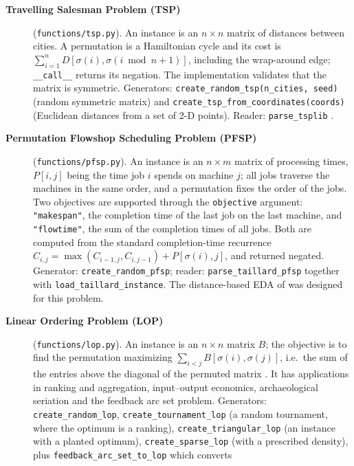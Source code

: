 \documentclass[a4paper,11pt]{article}
\begin{document}
\begin{description}
  \item[\textbf{Travelling Salesman Problem (TSP)}]
    (\texttt{functions/tsp.py}).  An instance is an $n \times n$ matrix of
    distances between cities.  A permutation is a Hamiltonian cycle and its cost
    is
    $\sum_{i=1}^{n} D[\sigma(i), \sigma(i \bmod n + 1)]$,
    including the wrap-around edge; \texttt{\_\_call\_\_} returns its negation.
    The implementation validates that the matrix is symmetric.  Generators:
    \texttt{create\_random\_tsp(n\_cities, seed)} (random symmetric matrix) and
    \texttt{create\_tsp\_from\_coordinates(coords)} (Euclidean distances from a
    set of 2-D points).  Reader: \texttt{parse\_tsplib} \citep{Reinelt:1991}.
  \item[\textbf{Permutation Flowshop Scheduling Problem (PFSP)}]
    (\texttt{functions/pfsp.py}).  An instance is an $n \times m$ matrix of
    processing times, $P[i,j]$ being the time job $i$ spends on machine $j$; all
    jobs traverse the machines in the same order, and a permutation fixes the
    order of the jobs.  Two objectives are supported through the
    \texttt{objective} argument: \texttt{"makespan"}, the completion time of the
    last job on the last machine, and \texttt{"flowtime"}, the sum of the
    completion times of all jobs.  Both are computed from the standard
    completion-time recurrence
    $C_{i,j} = \max(C_{i-1,j}, C_{i,j-1}) + P[\sigma(i), j]$, and returned
    negated.  Generator: \texttt{create\_random\_pfsp}; reader:
    \texttt{parse\_taillard\_pfsp} \citep{Taillard:1993} together with
    \texttt{load\_taillard\_instance}.  The distance-based EDA of
    \cite{Ceberio_et_al:2014} was designed for this problem.
  \item[\textbf{Linear Ordering Problem (LOP)}]
    (\texttt{functions/lop.py}).  An instance is an $n \times n$ matrix $B$; the
    objective is to find the permutation maximizing
    $\sum_{i<j} B[\sigma(i), \sigma(j)]$, i.e.\ the sum of the entries above the
    diagonal of the permuted matrix \citep{Grotschel_et_al:1984,Marti_and_Reinelt:2011}.
    It has applications in ranking and aggregation, input--output economics,
    archaeological seriation and the feedback arc set problem.  Generators:
    \texttt{create\_random\_lop}, \texttt{create\_tournament\_lop} (a random
    tournament, where the optimum is a ranking), \texttt{create\_triangular\_lop}
    (an instance with a planted optimum), \texttt{create\_sparse\_lop} (with a
    prescribed density), plus \texttt{feedback\_arc\_set\_to\_lop} which converts

\end{description}
\end{document}
